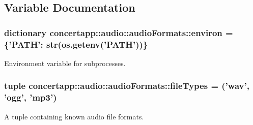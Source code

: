 \subsection{Variable Documentation}
\hypertarget{namespaceconcertapp_1_1audio_1_1audio_formats_a3d9b8f69139bf0a6fce9d1d585974039}{
\subsubsection[{environ}]{\setlength{\rightskip}{0pt plus 5cm}dictionary {\bf concertapp::audio::audioFormats::environ} = \{'PATH': str(os.getenv('PATH'))\}}}
\label{namespaceconcertapp_1_1audio_1_1audio_formats_a3d9b8f69139bf0a6fce9d1d585974039}


Environment variable for subprocesses. 

\hypertarget{namespaceconcertapp_1_1audio_1_1audio_formats_a3e84815c81164317725d83ae9e1af87e}{
\subsubsection[{fileTypes}]{\setlength{\rightskip}{0pt plus 5cm}tuple {\bf concertapp::audio::audioFormats::fileTypes} = ('{\bf wav}', '{\bf ogg}', '{\bf mp3}')}}
\label{namespaceconcertapp_1_1audio_1_1audio_formats_a3e84815c81164317725d83ae9e1af87e}


A tuple containing known audio file formats. 

